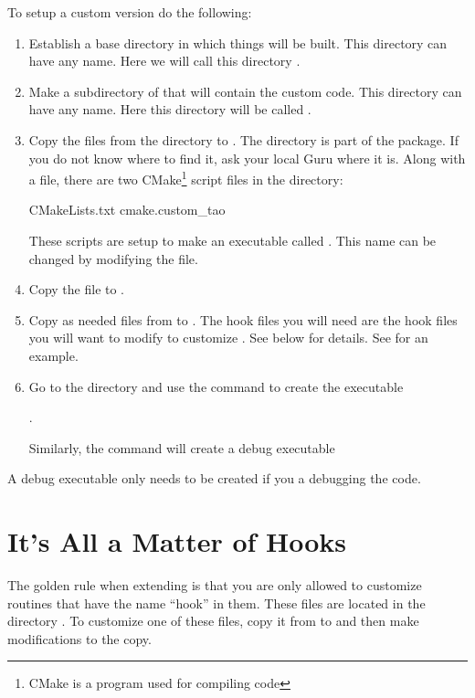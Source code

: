 To setup a custom \tao version do the following:
  \begin{enumerate}
  \item
Establish a base directory in which things will be built. This directory can have any name. Here we
will call this directory .
  \item
Make a subdirectory of  that will contain the custom code.  This directory can have any
name.  Here this directory will be called .
  \item
Copy the files from the directory  to . The 
directory is part of the \bmad package. If you do not know where to find it, ask your local Guru
where it is. Along with a  file, there are two CMake\footnote{CMake is a program used for
compiling code}  script files in the
 directory:
\begin{example}
  CMakeLists.txt
  cmake.custom_tao
\end{example}
These scripts are setup to make an executable called . This name can be changed
by modifying the  file.
  \item
Copy the file  to .
  \item
Copy as needed  files from  to . The hook files
you will need are the hook files you will want to modify to customize \tao. See below for
details. See  for an example.
  \item
Go to the  directory and use the command  to create the
executable 
\begin{example}
    . 
\end{example}
Similarly, the command  will create a debug executable 
\begin{example}
\end{example}
	\end{enumerate}
A debug executable only needs to be created if you a debugging the code.

\section{It's All a Matter of Hooks}

The golden rule when extending \tao is that you are only allowed to
customize routines that have the name ``hook'' in
them. These files are located in the directory .
To customize one of these files, copy it from  to 
and then make modifications to the copy.

